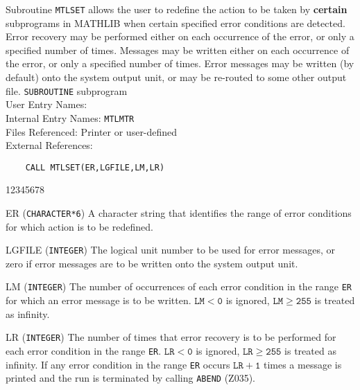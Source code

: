                           
                            
\Submitter{}                                  
                      
Subroutine {\tt MTLSET} allows the user to redefine the action to be
taken by {\bf certain} subprograms in MATHLIB
when certain specified error conditions are detected.
Error recovery may be performed either on each occurrence of the error,
or only a specified number of times. Messages may be written either on
each occurrence of the error, or only a specified number of times. Error
messages may be written (by default) onto the system output unit, or
may be re-routed to some other output file.
\Structure
{\tt SUBROUTINE} subprogram \\
User Entry Names: \\
Internal Entry Names: {\tt MTLMTR}\\
Files Referenced: Printer or user-defined\\
External References:  
\Usage
\begin{verbatim}
    CALL MTLSET(ER,LGFILE,LM,LR)
\end{verbatim}
\begin{DLtt}{12345678}
\item [ER] ({\tt CHARACTER*6}) A character string that identifies the
range of error conditions for which action is to be redefined.
\item [LGFILE]({\tt INTEGER}) The logical unit number to be used
for error messages, or zero if error messages are to be written
onto the system output unit.
\item [LM] ({\tt INTEGER}) The number of occurrences of each error
condition in the range {\tt ER} for which an error message is to be
written. $\mathtt{LM<0}$ is ignored, $\mathtt{LM \ge 255}$ is treated
as infinity.
\item [LR] ({\tt INTEGER}) The number of times that error
recovery is to be performed for each error condition in the range
{\tt ER}. $\mathtt{LR<0} $ is ignored,
$\mathtt{LR \ge 255}$ is treated as infinity. If any error condition in
the range {\tt ER} occurs $\mathtt{LR+1}$ times a message is printed and
the run is terminated by calling {\tt ABEND} (Z035).
\end{DLtt}
\Notes
